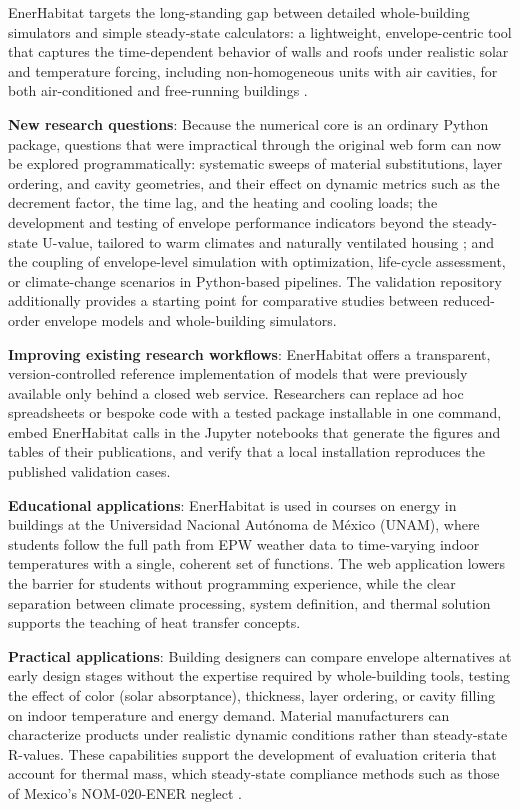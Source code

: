 \documentclass[preprint,12pt, a4paper]{elsarticle}
\begin{document}
EnerHabitat targets the long-standing gap between detailed whole-building simulators and simple steady-state calculators: a lightweight, envelope-centric tool that captures the time-dependent behavior of walls and roofs under realistic solar and temperature forcing, including non-homogeneous units with air cavities, for both air-conditioned and free-running buildings \cite{barrios2016enerhabitat}.

\textbf{New research questions}: Because the numerical core is an ordinary Python package, questions that were impractical through the original web form can now be explored programmatically: systematic sweeps of material substitutions, layer ordering, and cavity geometries, and their effect on dynamic metrics such as the decrement factor, the time lag, and the heating and cooling loads; the development and testing of envelope performance indicators beyond the steady-state U-value, tailored to warm climates and naturally ventilated housing \cite{barrios2011wall,barrios2012envelope}; and the coupling of envelope-level simulation with optimization, life-cycle assessment, or climate-change scenarios in Python-based pipelines. The validation repository additionally provides a starting point for comparative studies between reduced-order envelope models and whole-building simulators.

\textbf{Improving existing research workflows}: EnerHabitat offers a transparent, version-controlled reference implementation of models that were previously available only behind a closed web service. Researchers can replace ad hoc spreadsheets or bespoke code with a tested package installable in one command, embed EnerHabitat calls in the Jupyter notebooks that generate the figures and tables of their publications, and verify that a local installation reproduces the published validation cases.

\textbf{Educational applications}: EnerHabitat is used in courses on energy in buildings at the Universidad Nacional Aut\'onoma de M\'exico (UNAM), where students follow the full path from EPW weather data to time-varying indoor temperatures with a single, coherent set of functions. The web application lowers the barrier for students without programming experience, while the clear separation between climate processing, system definition, and thermal solution supports the teaching of heat transfer concepts.

\textbf{Practical applications}: Building designers can compare envelope alternatives at early design stages without the expertise required by whole-building tools, testing the effect of color (solar absorptance), thickness, layer ordering, or cavity filling on indoor temperature and energy demand. Material manufacturers can characterize products under realistic dynamic conditions rather than steady-state R-values. These capabilities support the development of evaluation criteria that account for thermal mass, which steady-state compliance methods such as those of Mexico's NOM-020-ENER \cite{nom020ener} neglect \cite{barrios2011wall}.
\end{document}
